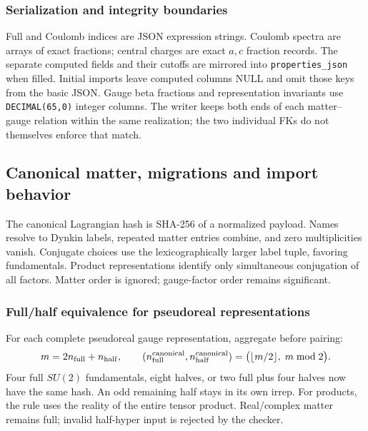 \documentclass[11pt,a4paper]{article}
\numberwithin{equation}{section}
\newcommand{\code}[1]{{\small\nolinkurl{#1}}}
\begin{document}
\subsubsection{Serialization and integrity boundaries}
Full and Coulomb indices are JSON expression strings. Coulomb spectra are
arrays of exact fractions; central charges are exact $a,c$ fraction records.
The separate computed fields and their cutoffs are mirrored into
\code{properties_json} when filled. Initial imports leave computed columns
NULL and omit those keys from the basic JSON. Gauge beta
fractions and representation invariants use \code{DECIMAL(65,0)} integer
columns. The writer keeps both ends of each matter--gauge relation within the
same realization; the two individual FKs do not themselves enforce that match.

\clearpage
\subsection{Canonical matter, migrations and import behavior}
The canonical Lagrangian hash is SHA-256 of a normalized payload. Names resolve
to Dynkin labels, repeated matter entries combine, and zero multiplicities
vanish. Conjugate choices use the lexicographically larger label tuple, favoring
fundamentals. Product representations identify only simultaneous conjugation of
all factors. Matter order is ignored; gauge-factor order remains significant.

\subsubsection{Full/half equivalence for pseudoreal representations}
For each complete pseudoreal gauge representation, aggregate before pairing:
\[
 m=2n_{\rm full}+n_{\rm half},\qquad
 (n_{\rm full}^{\rm canonical},n_{\rm half}^{\rm canonical})
 =\bigl(\lfloor m/2\rfloor,\;m\bmod2\bigr).
\]
Four full $SU(2)$ fundamentals, eight halves, or two full plus four halves now
have the same hash. An odd remaining half stays in its own irrep. For products,
the rule uses the reality of the entire tensor product. Real/complex matter
remains full; invalid half-hyper input is rejected by the checker.
\end{document}
